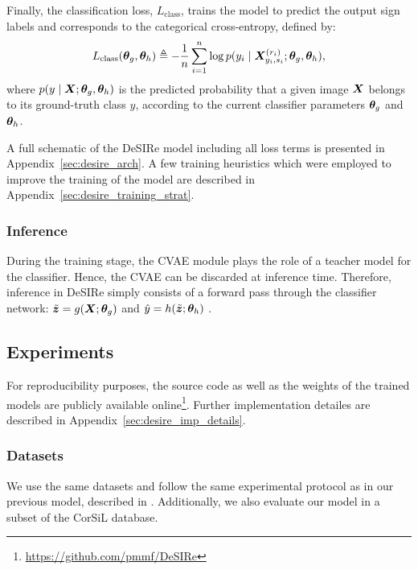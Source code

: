 Finally, the classification loss, $L_{\text{class}}$, trains the model to predict the output sign labels and corresponds to the categorical cross-entropy, defined by:
\begin{equation}
    \label{eq:desire_loss_class}
    L_{\text{class}}({\bm{\theta}}_{g},{\bm{\theta}}_{h}) \triangleq -\frac{1}{n} \sum_{i=1}^{n}\log p(y_{i} \mid {\bm{X}}^{(r_{i})}_{y_{i}, s_{i}};{\bm{\theta}}_{g},{\bm{\theta}}_{h}),
\end{equation}
where $p(y \mid {\bm{X}}; {\bm{\theta}}_{g},{\bm{\theta}}_{h})$ is the predicted probability that a given image ${\bm{X}}$ belongs to its ground-truth class $y$, according to the current classifier parameters ${\bm{\theta}}_{g}$ and ${\bm{\theta}}_{h}$.

A full schematic of the DeSIRe model including all loss terms is presented in Appendix~\ref{sec:desire_arch}. A few training heuristics which were employed to improve the training of the model are described in Appendix~\ref{sec:desire_training_strat}.

\subsubsection{Inference}
\label{sec:desire_inference}
During the training stage, the CVAE module plays the role of a teacher model for the classifier. Hence, the CVAE can be discarded at inference time. Therefore, inference in DeSIRe simply consists of a forward pass through the classifier network: $\tilde{{\bm{z}}} = g({\bm{X}}; {\bm{\theta}}_g)$ and $\hat{y} = h(\tilde{{\bm{z}}}; {\bm{\theta}}_h)$ .

\subsection{Experiments}
\label{sec:desire_experiments}

For reproducibility purposes, the source code as well as the weights of the trained models are publicly available online\footnote{\url{https://github.com/pmmf/DeSIRe}}. Further implementation detailes are described in Appendix~\ref{sec:desire_imp_details}.

\subsubsection{Datasets}
We use the same datasets and follow the same experimental protocol as in our previous model, described in . Additionally, we also evaluate our model in a subset of the CorSiL database.


